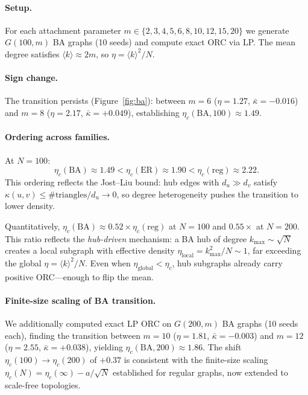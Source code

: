 \documentclass[11pt,a4paper]{article}
\newcommand{\etac}{\eta_c}
\begin{document}
\paragraph{Setup.}
For each attachment parameter $m\in\{2,3,4,5,6,8,10,12,15,20\}$ we
generate $G(100,m)$ BA graphs (10 seeds) and compute exact ORC via
LP. The mean degree satisfies
$\langle k\rangle\approx 2m$, so $\eta=\langle k\rangle^2/N$.

\paragraph{Sign change.}
The transition persists (Figure~\ref{fig:ba}): between $m=6$
($\eta=1.27$, $\bar\kappa=-0.016$) and $m=8$ ($\eta=2.17$,
$\bar\kappa=+0.049$), establishing
$\etac(\mathrm{BA},100)\approx 1.49$.

\paragraph{Ordering across families.}
At $N=100$:
\begin{equation}
  \etac(\mathrm{BA})\approx 1.49 < \etac(\mathrm{ER})\approx 1.90 <
  \etac(\mathrm{reg})\approx 2.22.
\end{equation}
This ordering reflects the Jost--Liu bound: hub edges with
$d_u\gg d_v$ satisfy $\kappa(u,v)\leq\#\text{triangles}/d_u\to 0$,
so degree heterogeneity pushes the transition to lower density.

Quantitatively, $\etac(\mathrm{BA}) \approx 0.52 \times \etac(\mathrm{reg})$ at $N=100$ and $0.55 \times$ at $N=200$. This ratio reflects the \emph{hub-driven} mechanism: a BA hub of degree $k_{\max} \sim \sqrt{N}$ creates a local subgraph with effective density $\eta_{\mathrm{local}} = k_{\max}^2/N \sim 1$, far exceeding the global $\eta = \langle k\rangle^2/N$. Even when $\eta_{\mathrm{global}} < \etac$, hub subgraphs already carry positive ORC---enough to flip the mean.

\paragraph{Finite-size scaling of BA transition.}
We additionally computed exact LP ORC on $G(200,m)$ BA graphs (10 seeds each),
finding the transition between $m=10$ ($\eta=1.81$, $\bar\kappa=-0.003$) and
$m=12$ ($\eta=2.55$, $\bar\kappa=+0.038$), yielding
$\etac(\mathrm{BA},200)\approx 1.86$.
The shift $\etac(100)\to\etac(200)$ of $+0.37$ is consistent with the
finite-size scaling $\etac(N)=\etac(\infty)-a/\sqrt{N}$ established for
regular graphs, now extended to scale-free topologies.
\end{document}
